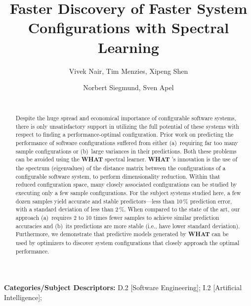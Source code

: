 \documentclass{sig-alternative}
\newcommand{\what}{{\bf WHAT }}
\begin{document}
\title{Faster Discovery of Faster System Configurations with Spectral Learning} 
\author{
        \alignauthor Vivek Nair, Tim Menzies, Xipeng Shen 
        \\
    \and  
        \alignauthor Norbert Siegmund, Sven Apel \\
        \\
       }
\maketitle 
\thispagestyle{plain}
\pagestyle{plain}
\begin{abstract}
Despite the huge spread and economical importance of configurable software systems, there is only unsatisfactory support in utilizing the full potential of these systems with respect to finding a performance-optimal configuration.
Prior work on predicting the performance of software configurations suffered from either (a)~requiring far too many sample configurations or (b)~large variances in their predictions.
Both these problems can be avoided using the \what spectral learner.  
{\what}'s innovation is  
the use of the spectrum (eigenvalues) of the distance matrix
between the configurations of a configurable software system, to perform dimensionality reduction. Within that
reduced configuration space, many closely associated configurations can be studied
by executing only a few sample configurations. For the subject systems studied
here, a few dozen samples yield accurate and stable predictors---less than 10\,\% prediction error, with a standard deviation of less than 2\,\%.  
When compared to the state of the art, our approach (a)~requires 
2 to 10 times fewer samples to achieve similar prediction accuracies
and (b)~its predictions are  more stable (i.e., have lower standard
deviation). 
Furthermore, we demonstrate that predictive models generated by
\what can be used by optimizers to discover system configurations that closely approach the optimal performance.
\end{abstract}

\vspace{1mm}
\noindent
{\bf Categories/Subject Descriptors:} 
D.2 [Software Engineering];
I.2 [Artificial Intelligence];
\end{document}
